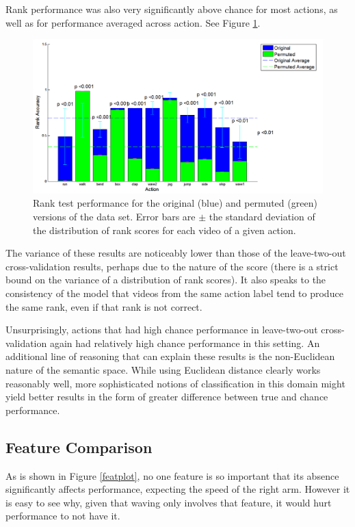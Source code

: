 \documentclass{article}
\begin{document}
Rank performance was also very significantly above chance for most actions, as well as for performance averaged across action. See Figure \ref{rankplot}. 

\begin{figure}[h]
  \centering
  \includegraphics[width=.9\linewidth]{rank_snap_new}
  \caption{Rank test performance for the original (blue) and permuted (green) versions of the data set.  Error bars are $\pm$ the standard deviation of the distribution of rank scores for each video of a given action.}
  \label{rankplot}
\end{figure}

The variance of these results are noticeably lower than those of the leave-two-out cross-validation results, perhaps due to the nature of the score (there is a strict bound on the variance of a distribution of rank scores).  It also speaks to the consistency of the model that videos from the same action label tend to produce the same rank, even if that rank is not correct.

Unsurprisingly, actions that had high chance performance in leave-two-out cross-validation again had relatively high chance performance in this setting. An additional line of reasoning that can explain these results is the non-Euclidean nature of the semantic space. While using Euclidean distance clearly works reasonably well, more sophisticated notions of classification in this domain might yield better results in the form of greater difference between true and chance performance.

\subsection{Feature Comparison}

As is shown in Figure \ref{featplot}, no one feature is so important that its absence significantly affects performance, expecting the speed of the right arm.  However it is easy to see why, given that waving only involves that feature, it would hurt performance to not have it.
\end{document}
